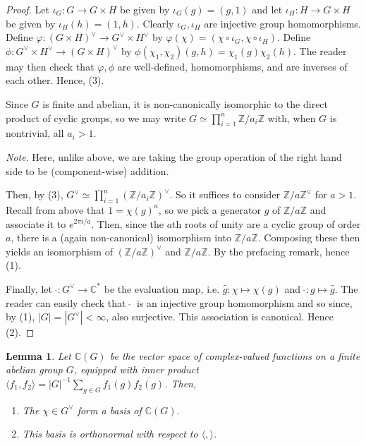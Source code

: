 \documentclass[12pt]{article}
\newcommand{\ints}{\mathbb{Z}}
\newcommand{\complex}{\mathbb{C}}
\newcommand{\iprod}[2]{\langle #1, #2 \rangle}
\newcommand{\intsmod}[1]{\ints / #1 \ints}
\newtheorem{lemma}{Lemma}
\numberwithin{equation}{section}
\numberwithin{thm}{section}
\numberwithin{lemma}{section}
\numberwithin{cor}{section}
\begin{document}
\begin{proof}
  Let $\iota_G: G \to G \times H$ be given by $\iota_G(g) = (g, 1)$ and let $\iota_H: H \to G \times H$ be given by $\iota_H (h) = (1, h)$. Clearly $\iota_G, \iota_H$ are injective group homomorphisms. Define $\varphi: (G \times H)^{\vee} \to G^{\vee} \times H^{\vee}$ by $\varphi (\chi) = (\chi \circ \iota_G , \chi \circ \iota_H)$. Define $\phi: G^{\vee} \times H^{\vee} \to (G \times H)^{\vee}$ by $\phi(\chi_1, \chi_2)(g, h) = \chi_1(g)\chi_2(h)$. The reader may then check that $\varphi, \phi$ are well-defined, homomorphisms, and are inverses of each other. Hence, (3).

  Since $G$ is finite and abelian, it is non-canonically isomorphic to the direct product of cyclic groups, so we may write $G \simeq \prod_{i = 1}^{n} \intsmod{a_i}$ with, when $G$ is nontrivial, all $a_i > 1$. 
  
  \textit{Note}. Here, unlike above, we are taking the group operation of the right hand side to be (component-wise) addition.
  
  Then, by (3), $G^{\vee} \simeq \prod_{i = 1}^n (\intsmod{a_i})^{\vee}$. So it suffices to consider $\intsmod{a}^{\vee}$ for $a > 1$. Recall from above that $1 = \chi(g)^a$, so we pick a generator $g$ of $\intsmod{a}$ and associate it to $e^{2 \pi i / a}$. Then, since the $a$th roots of unity are a cyclic group of order $a$, there is a (again non-canonical) isomorphism into $\intsmod{a}$. Composing these then yields an isomorphism of $(\intsmod{a})^{\vee}$ and $\intsmod{a}$. By the prefacing remark, hence (1).

  Finally, let $\ \widehat{} : G^{\vee} \to \complex^*$ be the evaluation map, i.e. $\widehat{g} : \chi \mapsto \chi(g)$ and $\ \widehat{} : g \mapsto \widehat{g}$. The reader can easily check that $\ \widehat{} \ $ is an injective group homomorphism and so since, by (1), $|G| = |G^{\vee}| < \infty$, also surjective. This association is canonical. Hence (2).
\end{proof}

\begin{lemma}\label{DualIsOrthonormalBasis}
  Let $\complex(G)$ be the vector space of complex-valued functions on a finite abelian group $G$, equipped with inner product $\iprod{f_1}{f_2} = |G|^{-1} \sum_{g \in G} f_1(g) \overline{f_2(g)}$. Then,
  \begin{enumerate}
    \item The $\chi \in G^{\vee}$ form a basis of $\complex(G)$.
    \item This basis is orthonormal with respect to $\iprod{}{}$.
  \end{enumerate}
\end{lemma}
\end{document}
